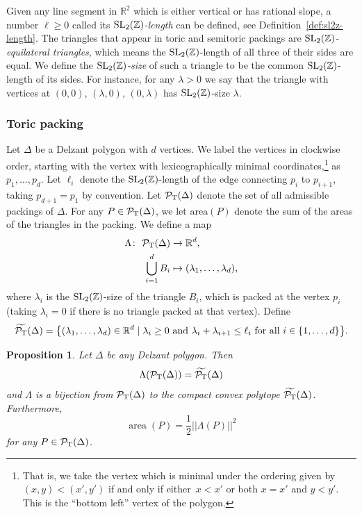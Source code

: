 \documentclass[pdftex]{sigma}
\numberwithin{equation}{section}
\newtheorem{Proposition}[Theorem]{Proposition}
\def\R{{\mathbb R}}
\def\Z{{\mathbb Z}}
\newcommand{\De}{\Delta}
\newcommand{\area}{\operatorname{area}}
\newcommand{\PT}{\mathcal{P}_{\rm T}}
\newcommand{\PTtilde}{\widetilde{\PT}}
\newcommand{\SL}{{\rm SL}_2(\Z)}
\begin{document}
Given any line segment in $\R^2$ which is either vertical or has rational slope, a number $\ell\geq 0$ called its \emph{$\SL$-length} can be defined, see Definition~\ref{def:sl2z-length}.
The triangles that appear in toric and semitoric packings are \emph{$\SL$-equilateral triangles}, which means the $\SL$-length of all three of their sides are equal. We define the \emph{$\SL$-size} of such a triangle to be the common $\SL$-length of its sides. For instance, for any $\lambda>0$ we say that the triangle with vertices at $(0,0)$, $(\lambda,0)$, $(0,\lambda)$ has $\SL$-size $\lambda$.

\subsubsection{Toric packing}
Let $\De$ be a Delzant polygon with $d$ vertices.
We label the vertices in clockwise order, starting with the vertex with lexicographically minimal coordinates,\footnote{That is, we take the vertex which is minimal under the ordering given by $(x,y)<(x',y')$ if and only if either~$x<x'$ or both $x=x'$ and $y< y'$. This is the ``bottom left'' vertex of the polygon.} as $p_1,\ldots,p_d$.
Let $\ell_i$ denote the $\SL$-length of the edge connecting $p_i$ to $p_{i+1}$, taking $p_{d+1} = p_1$ by convention.
Let $\PT(\De)$ denote the set of all admissible packings of $\De$.
For any $P\in\PT(\De)$, we let $\textrm{area}(P)$ denote the sum of the areas of the triangles in the packing.
We define a map
 \begin{align} \Lambda \colon\ \PT(\De) & \to \R^d, \label{eqn:Lambda} \\ \bigcup_{i=1}^d B_i & \mapsto (\lambda_1,\ldots, \lambda_d),\nonumber
\end{align}
 where $\lambda_i$ is the $\SL$-size of the triangle $B_i$, which is packed at the vertex $p_i$ (taking $\lambda_i=0$ if there is no triangle packed at that vertex).
Define
\begin{equation}\label{eqn:tildePT}
 \PTtilde(\De) = \big\{(\lambda_1,\ldots,\lambda_d)\in\R^d \mid \lambda_i\geq 0 \text{ and } \lambda_i+\lambda_{i+1}\leq \ell_i \text{ for all }i\in\{1,\ldots,d\}\big\}.
\end{equation}


\begin{Proposition}\label{prop:toric}
 Let $\De$ be any Delzant polygon. Then
 \[
 \Lambda(\PT(\De)) = \PTtilde(\De)
 \]
 and $\Lambda$ is a bijection from $\PT(\De)$ to the compact convex polytope $\PTtilde(\De)$.
 Furthermore,
 \begin{equation}\label{eqn:LambdaP-magnitude}
 \area(P) = \frac{1}{2}||\Lambda(P)||^2
 \end{equation}
 for any $P\in\PT(\De)$.
 \end{Proposition}
\end{document}
